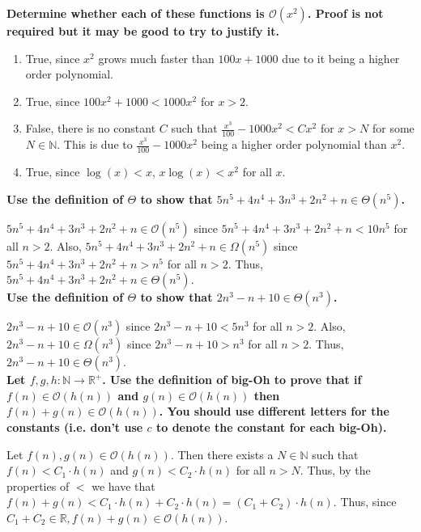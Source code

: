 \documentclass[letterpaper, 12pt]{article}
\begin{document}
\noindent\textbf{Determine whether each of these functions is $\mathcal{O}(x^2)$. Proof is not required but it may be good to try to justify it.}
\begin{enumerate}
    \item True, since $x^2$ grows much faster than $100x + 1000$ due to it being a higher order polynomial.
    \item True, since $100x^2 + 1000 < 1000x^2$ for $x > 2$.
    \item False, there is no constant $C$ such that $\frac{x^3}{100} - 1000x^2 < Cx^2$ for $x>N$ for some $N\in\mathbb{N}$. This is due to $\frac{x^3}{100} - 1000x^2$ being a higher order polynomial than $x^2.$
    \item True, since $\log(x) < x$, $x\log(x) < x^2$ for all $x$.
\end{enumerate}

\noindent\textbf{Use the definition of $\Theta$ to show that $5n^5 + 4n^4 + 3n^3 + 2n^2 + n \in \Theta(n^5)$.}

    $5n^5 + 4n^4 + 3n^3 + 2n^2 + n \in \mathcal{O}(n^5)$ since $5n^5 + 4n^4 + 3n^3 + 2n^2 + n < 10n^5$ for all $n>2$. Also, $5n^5 + 4n^4 + 3n^3 + 2n^2 + n \in \Omega(n^5)$ since $5n^5 + 4n^4 + 3n^3 + 2n^2 + n > n^5$ for all $n>2$. Thus, $5n^5 + 4n^4 + 3n^3 + 2n^2 + n \in \Theta(n^5)$.\\

\noindent\textbf{Use the definition of $\Theta$ to show that $2n^3 - n + 10 \in\Theta(n^3)$.}

    $2n^3 - n + 10 \in \mathcal{O}(n^3)$ since $2n^3 - n + 10 < 5n^3$ for all $n>2$. Also, $2n^3 - n + 10 \in \Omega(n^3)$ since $2n^3 - n + 10 > n^3$ for all $n>2$. Thus, $2n^3 - n + 10 \in \Theta(n^3)$.\\

\noindent\textbf{Let $f, g, h : \mathbb{N} \rightarrow \mathbb{R}^+$. Use the definition of big-Oh to prove that if $f (n) \in \mathcal{O}(h(n))$ and $g(n) \in \mathcal{O}(h(n))$ then $f (n) + g(n) \in \mathcal{O}(h(n))$. You should use different letters for the constants (i.e. don’t use $c$ to denote the constant for each big-Oh).}

    Let $f(n), g(n)\in\mathcal{O}(h(n))$. Then there exists a $N\in\mathbb{N}$ such that $f(n) < C_1\cdot h(n)$ and $g(n) < C_2\cdot h(n)$ for all $n > N$. Thus, by the properties of $<$ we have that $f(n) + g(n) < C_1\cdot h(n) + C_2\cdot h(n) = (C_1 + C_2)\cdot h(n)$. Thus, since $C_1 + C_2 \in\mathbb{R}, f(n) + g(n) \in\mathcal{O}(h(n))$.
\end{document}
